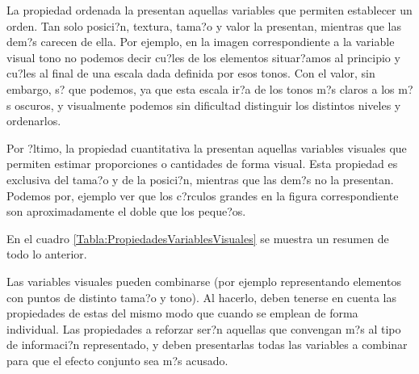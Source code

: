 La propiedad ordenada la presentan aquellas variables que permiten establecer un orden. Tan solo posici?n, textura, tama?o y valor la presentan, mientras que las dem?s carecen de ella. Por ejemplo, en la imagen correspondiente a la variable visual tono no podemos decir cu?les de los elementos situar?amos al principio y cu?les al final de una escala dada definida por esos tonos. Con el valor, sin embargo, s? que podemos, ya que esta escala ir?a de los tonos m?s claros a los m?s oscuros, y visualmente podemos sin dificultad distinguir los distintos niveles y ordenarlos.

Por ?ltimo, la propiedad cuantitativa la presentan aquellas variables visuales que permiten estimar proporciones o cantidades de forma visual. Esta propiedad es exclusiva del tama?o y de la posici?n, mientras que las dem?s no la presentan. Podemos por, ejemplo ver que los c?rculos grandes en la figura correspondiente son aproximadamente el doble que los peque?os. 

En el cuadro \ref{Tabla:PropiedadesVariablesVisuales} se muestra un resumen de todo lo anterior.


Las variables visuales pueden combinarse (por ejemplo representando elementos con puntos de distinto tama?o y tono). Al hacerlo, deben tenerse en cuenta las propiedades de estas del mismo modo que cuando se emplean de forma individual. Las propiedades a reforzar ser?n aquellas que convengan m?s al tipo de informaci?n representado, y deben presentarlas todas las variables a combinar para que el efecto conjunto sea m?s acusado.


